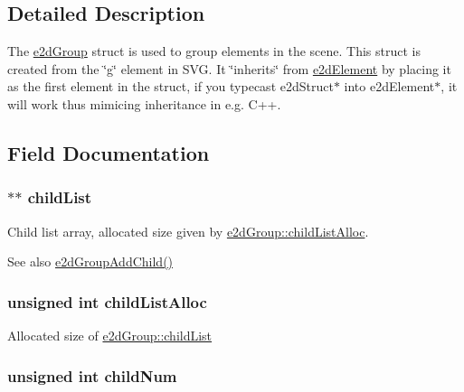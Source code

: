 \subsection{Detailed Description}
The \hyperlink{structe2d_group}{e2d\-Group} struct is used to group elements in the scene. This struct is created from the \char`\"{}g\char`\"{} element in S\-V\-G. It \char`\"{}inherits\char`\"{} from \hyperlink{structe2d_element}{e2d\-Element} by placing it as the first element in the struct, if you typecast e2d\-Struct$\ast$ into e2d\-Element$\ast$, it will work thus mimicing inheritance in e.\-g. C++. 

\subsection{Field Documentation}
\hypertarget{structe2d_group_a55f6dde874716dc99dcd270fc0999a01}{
\subsubsection[{child\-List}]{$\ast$$\ast$ {\bf child\-List}}}\label{structe2d_group_a55f6dde874716dc99dcd270fc0999a01}
Child list array, allocated size given by \hyperlink{structe2d_group_a9c89d7cf35b835ef1917855c78a79cc5}{e2d\-Group\-::child\-List\-Alloc}. \begin{DoxySeeAlso}{See also}
\hyperlink{group__e2d_group_ga6ae76730f78ad731621e9286a3980b8a}{e2d\-Group\-Add\-Child()} 
\end{DoxySeeAlso}
\hypertarget{structe2d_group_a9c89d7cf35b835ef1917855c78a79cc5}{
\subsubsection[{child\-List\-Alloc}]{\setlength{\rightskip}{0pt plus 5cm}unsigned int {\bf child\-List\-Alloc}}}\label{structe2d_group_a9c89d7cf35b835ef1917855c78a79cc5}
Allocated size of \hyperlink{structe2d_group_a55f6dde874716dc99dcd270fc0999a01}{e2d\-Group\-::child\-List} \hypertarget{structe2d_group_a0af3697c2c9df6ed0ddd340cded35d65}{
\subsubsection[{child\-Num}]{\setlength{\rightskip}{0pt plus 5cm}unsigned int {\bf child\-Num}}}\label{structe2d_group_a0af3697c2c9df6ed0ddd340cded35d65}
